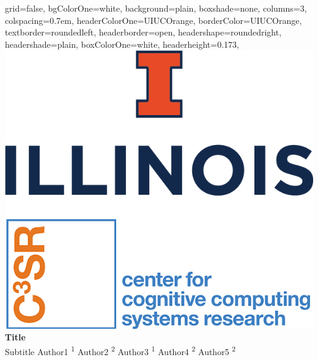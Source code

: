 \documentclass[landscape,paperwidth=182cm,paperheight=120cm, fontscale=0.17]{baposter}
\begin{document}
\begin{poster}{
    grid=false,
    bgColorOne=white,
    background=plain, %
    boxshade=none,
    columns=3,
    colspacing=0.7em,
    headerColorOne=UIUCOrange,
    borderColor=UIUCOrange,
    textborder=roundedleft, %
    headerborder=open,
    headershape=roundedright,
    headershade=plain,
    boxColorOne=white, %
    headerheight=0.173\textheight,
}
{
    \includegraphics[height=0.14\textheight]{templte_figs/logo_combine.png}
}
{
    \sc \huge \textbf{Title} \\
    Subtitle
}
{
    \Large
    \vspace{0.1cm}
    Author1 \textsuperscript{1} \hspace{0.15cm}
    Author2 \textsuperscript{2} \hspace{0.15cm}
    Author3 \textsuperscript{1} \hspace{0.15cm}
    Author4 \textsuperscript{2} \hspace{0.15cm}
    Author5 \textsuperscript{2} \hspace{0.15cm}
}
\end{poster}
\end{document}

